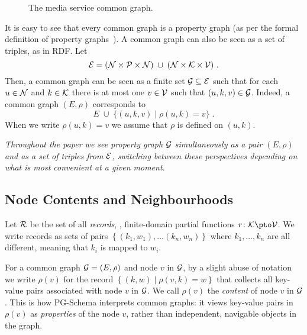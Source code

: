 
\begin{figure}[t]
\caption{The media service common graph. }
\label{fig:common-graph}
\end{figure}

It is easy to see that every common graph is a property graph (as per the formal
definition of property graphs~\cite{ABDF23}).
A common graph can also be seen as a set of triples, as in RDF.
Let
\[
  \mathcal{E}
=
  \left( \mathcal{N} \times \mathcal{P} \times \mathcal{N} \right)
\;\cup\;
  \left( \mathcal{N} \times \mathcal{K} \times \mathcal{V} \right)\,.
\]
Then, a common graph can be seen as a finite set $\mathcal{G} \subseteq \mathcal{E}$
such that for each $u \in \mathcal{N}$ and $k \in \mathcal{K}$ there is at most one
$v \in \mathcal{V}$ such that $(u, k, v) \in \mathcal{G}$.
Indeed, a common graph $(E, \rho)$ corresponds to
\[
  E \;\cup\; \{ (u, k, v) \mid \rho(u,k) = v\}\;.
\]
When we write $\rho(u, k) = v$ we assume that $\rho$ is defined on $(u, k)$.

\medskip

\noindent\emph{Throughout the paper we see property graph $\mathcal{G}$
simultaneously as a pair $(E, \rho)$ and as a set of triples from $\mathcal{E}$,
switching between these perspectives depending on what is most convenient at a
given moment.}


\subsection{Node Contents and  Neighbourhoods}

Let $\mathcal{R}$ be the set of all \emph{records}, \ie, finite-domain partial
functions $r \colon \Keys \pto \Values$.
We write records as sets of pairs $\left\{ (k_1, w_1), \dots (k_n, w_n)
\right\}$ where $k_1, \dots, k_n$ are all different, meaning that $k_i$ is
mapped to $w_i$.

For a common graph $\mathcal{G} = (E,\rho)$ and node $v$ in $\mathcal{G}$, by a slight
abuse of notation we write $\rho(v)$ for the record $\left\{ (k, w) \mid
\rho(v,k) = w \right\}$ that collects all key-value pairs associated with node
$v$ in $\mathcal{G}$.
We call $\rho(v)$ the \emph{content} of node $v$ in $\mathcal{G}$.
This is how PG-Schema interprets common graphs: it views key-value pairs in
$\rho(v)$ as \emph{properties} of the node $v$, rather than independent,
navigable objects in the graph.

